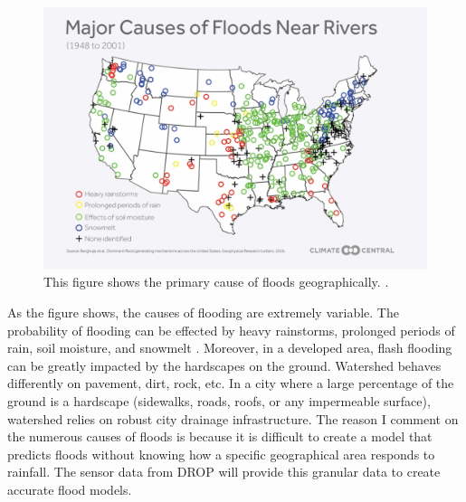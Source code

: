 \documentclass[letter]{article}
\begin{document}
\begin{figure}[ht]
	\centering
	\includegraphics[width=.8\textwidth]{img/causesOfFlooding.jpg}
	\caption{\label{fig:floodCauses} This figure shows the primary cause of floods geographically. \cite{floodDays}.}
\end{figure}

As the figure shows, the causes of flooding are extremely variable. The probability of flooding can be effected by heavy rainstorms, prolonged periods of rain, soil moisture, and snowmelt \cite{floodDays}. Moreover, in a developed area, flash flooding can be greatly impacted by the hardscapes on the ground. Watershed behaves differently on pavement, dirt, rock, etc. In a city where a large percentage of the ground is a hardscape (sidewalks, roads, roofs, or any impermeable surface), watershed relies on robust city drainage infrastructure. The reason I comment on the numerous causes of floods is because it is difficult to create a model that predicts floods without knowing how a specific geographical area responds to rainfall. The sensor data from DROP will provide this granular data to create accurate flood models. 
\end{document}
